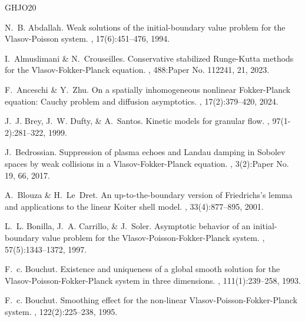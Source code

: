 \documentclass[10pt, reqno]{amsart}
\theoremstyle{plain}
\theoremstyle{definition}
\theoremstyle{remark}
\numberwithin{equation}{section}
\begin{document}
%
%
%
%
%
%


 
\begin{thebibliography}{GHJO20}

{\sc N.~B. Abdallah}.
\newblock Weak solutions of the initial-boundary value problem for the {V}lasov-{P}oisson system.
, 17(6):451--476, 1994.

{\sc I.~Almuslimani \& N.~Crouseilles}.
\newblock Conservative stabilized {R}unge-{K}utta methods for the {V}lasov-{F}okker-{P}lanck equation.
, 488:Paper No. 112241, 21, 2023.

{\sc F.~Anceschi \& Y.~Zhu.}
\newblock On a spatially inhomogeneous nonlinear {F}okker-{P}lanck equation: {C}auchy problem and diffusion asymptotics.
, 17(2):379--420, 2024.

{\sc J.~J. Brey, J.~W. Dufty, \& A.~Santos.}
\newblock Kinetic models for granular flow.
, 97(1-2):281--322, 1999.

{\sc J.~Bedrossian.}
\newblock Suppression of plasma echoes and {L}andau damping in {S}obolev spaces by weak collisions in a {V}lasov-{F}okker-{P}lanck equation.
, 3(2):Paper No. 19, 66, 2017.

{\sc A.~Blouza \& H.~Le~Dret.}
\newblock An up-to-the-boundary version of {F}riedrichs's lemma and applications to the linear {K}oiter shell model.
, 33(4):877--895, 2001.

{\sc L.~L. Bonilla, J.~A. Carrillo, \& J.~Soler.}
\newblock Asymptotic behavior of an initial-boundary value problem for the
  {V}lasov-{P}oisson-{F}okker-{P}lanck system.
, 57(5):1343--1372, 1997.

{\sc  F.~c. Bouchut.}
\newblock Existence and uniqueness of a global smooth solution for the
  {V}lasov-{P}oisson-{F}okker-{P}lanck system in three dimensions.
, 111(1):239--258, 1993.

{\sc  F.~c. Bouchut.}
\newblock Smoothing effect for the non-linear
  {V}lasov-{P}oisson-{F}okker-{P}lanck system.
, 122(2):225--238, 1995.


\end{thebibliography}
\end{document}
